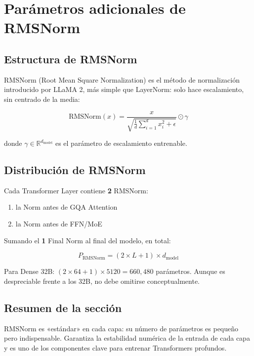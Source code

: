 \section{Parámetros adicionales de RMSNorm}

\subsection{Estructura de RMSNorm}

RMSNorm (Root Mean Square Normalization) es el método de normalización introducido por LLaMA 2, más simple que LayerNorm: solo hace escalamiento, sin centrado de la media:

$$
\text{RMSNorm}(x) = \frac{x}{\sqrt{\frac{1}{d}\sum_{i=1}^d x_i^2 + \epsilon}} \odot \gamma
$$

donde $\gamma \in \mathbb{R}^{d_{\text{model}}}$ es el parámetro de escalamiento entrenable.

\subsection{Distribución de RMSNorm}

Cada Transformer Layer contiene \textbf{2} RMSNorm:
\begin{enumerate}
  \item la Norm antes de GQA Attention
  \item la Norm antes de FFN/MoE
\end{enumerate}

Sumando el \textbf{1} Final Norm al final del modelo, en total:

$$
P_{\text{RMSNorm}} = (2 \times L + 1) \times d_{\text{model}}
$$

Para Dense 32B: $(2 \times 64 + 1) \times 5120 = 660{,}480$ parámetros. Aunque es despreciable frente a los 32B, no debe omitirse conceptualmente.

\subsection{Resumen de la sección}

RMSNorm es «estándar» en cada capa: su número de parámetros es pequeño pero indispensable. Garantiza la estabilidad numérica de la entrada de cada capa y es uno de los componentes clave para entrenar Transformers profundos.

